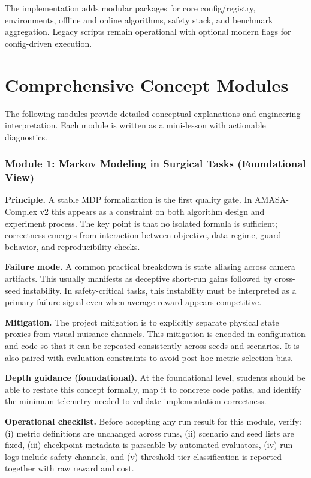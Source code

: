 \documentclass[conference]{IEEEtran}
\begin{document}
The implementation adds modular packages for core config/registry, environments, offline and online algorithms, safety stack, and benchmark aggregation. Legacy scripts remain operational with optional modern flags for config-driven execution.

\section{Comprehensive Concept Modules}
The following modules provide detailed conceptual explanations and engineering interpretation. Each module is written as a mini-lesson with actionable diagnostics.

\subsubsection{Module 1: Markov Modeling in Surgical Tasks (Foundational View)}
\textbf{Principle.} A stable MDP formalization is the first quality gate. In AMASA-Complex v2 this appears as a constraint on both algorithm design and experiment process. The key point is that no isolated formula is sufficient; correctness emerges from interaction between objective, data regime, guard behavior, and reproducibility checks.

\textbf{Failure mode.} A common practical breakdown is state aliasing across camera artifacts. This usually manifests as deceptive short-run gains followed by cross-seed instability. In safety-critical tasks, this instability must be interpreted as a primary failure signal even when average reward appears competitive.

\textbf{Mitigation.} The project mitigation is to explicitly separate physical state proxies from visual nuisance channels. This mitigation is encoded in configuration and code so that it can be repeated consistently across seeds and scenarios. It is also paired with evaluation constraints to avoid post-hoc metric selection bias.

\textbf{Depth guidance (foundational).} At the foundational level, students should be able to restate this concept formally, map it to concrete code paths, and identify the minimum telemetry needed to validate implementation correctness.

\textbf{Operational checklist.} Before accepting any run result for this module, verify: (i) metric definitions are unchanged across runs, (ii) scenario and seed lists are fixed, (iii) checkpoint metadata is parseable by automated evaluators, (iv) run logs include safety channels, and (v) threshold tier classification is reported together with raw reward and cost.
\end{document}
